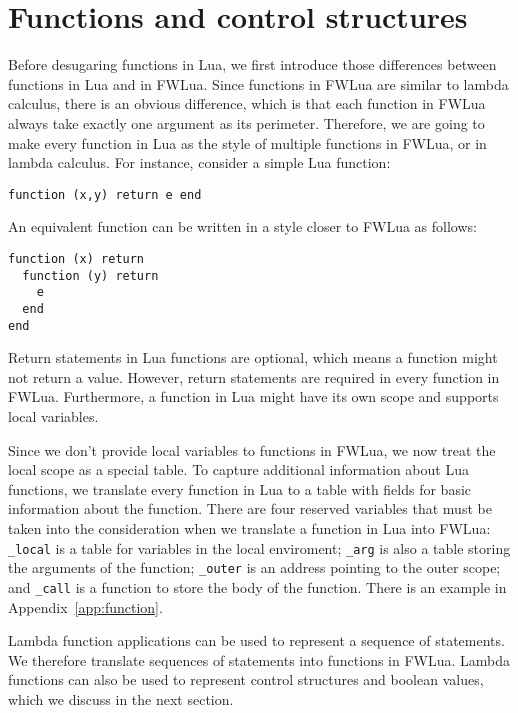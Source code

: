 \section{Functions and control structures}\label{sec:TraFunc}
Before desugaring functions in Lua, we first introduce those differences between functions in Lua and in FWLua. Since functions in FWLua are similar to lambda calculus, there is an obvious difference, which is that each function in FWLua always take exactly one argument as its perimeter. Therefore, we are going to make every function in Lua as the style of multiple functions in FWLua, or in lambda calculus. For instance, consider a simple Lua function:

\begin{verbatim}
function (x,y) return e end
\end{verbatim}

An equivalent function can be written in a style closer to FWLua as follows:

\begin{verbatim}
function (x) return 
  function (y) return 
    e
  end
end
\end{verbatim}


Return statements in Lua functions are optional, which means a function might not return a value. However, return statements are required in every function in FWLua.
Furthermore, a function in Lua might have its own scope and supports local variables. 

Since we don't provide local variables to functions in FWLua, we now treat the local scope as a special table.
To capture additional information about Lua functions,
we translate every function in Lua to a table with fields for basic information about the function. There are four reserved variables that must be taken into the consideration when we translate a function in Lua into FWLua: {\tt \_local} is a table for variables in the local enviroment; {\tt \_arg} is also a table storing the arguments of the function; {\tt \_outer} is an address pointing to the outer scope; and {\tt \_call} is a function to store the body of the function. There is an example in Appendix~\ref{app:function}.

Lambda function applications can be used to represent a sequence of  statements. We therefore translate sequences of statements into functions in FWLua. Lambda functions can also be used to represent control structures and boolean values, which we discuss in the next section.

